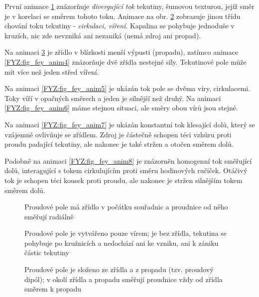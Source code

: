     První animace \ref{FYZ:fig_fey_anim1} znázorňuje \emph{divergující tok} tekutiny, šumovou 
    texturou, jejíž směr je v korelaci se směrem tohoto toku. Animace na obr. 
    \ref{FYZ:fig_fey_anim2} zobrazuje jinou třídu chování toku tekutiny  - \emph{cirkulaci, víření}. 
    Kapalina se pohybuje jednoduše v kruzích, nic zde nevzniká ani nezaniká (nemá zdroj ani 
    propad).   
                    
    Na animaci \ref{FYZ:fig_fey_anim3} je zřídlo v blízkosti menší výpusti (propadu), zatímco 
    animace \ref{FYZ:fig_fey_anim4} znázorňuje dvě zřídla nestejné síly. Tekutinové pole může mít 
    více než jeden střed víření. 
    
    Na animaci \ref{FYZ:fig_fey_anim5} je ukázán tok pole se dvěma víry, cirkulacemi. Toky víří v 
    opačných směrech a jeden je silnější než druhý. Na animaci \ref{FYZ:fig_fey_anim6} máme stejnou 
    situaci, ale směry obou vírů jsou stejné.    
    
    Na animaci \ref{FYZ:fig_fey_anim7} je ukázán konstantní tok klesající dolů, který se vzájemně 
    ovlivňuje se zřídlem. Zdroj je částečně schopen téci vzhůru proti proudu padající tekutiny, ale 
    nakonec je také stržen a otočen směrem dolů.
    
    Podobně na animaci \ref{FYZ:fig_fey_anim8} je znázorněn homogenní tok směřující dolů, 
    interagující s tokem cirkulujícím proti směru hodinových ručiček. Otáčivý tok je schopen téci 
    kousek proti proudu, ale nakonec je stržen silnějším tokem směrem dolů.           
    
    \begin{figure}
      \centering
      \caption{Proudové pole má zřídlo v počátku souřadnic a proudnice od něho směřují radiálně } 
      \label{FYZ:fig_fey_anim1}  
    \end{figure}
    
    \begin{figure} 
      \caption{Proudové pole je vytvářeno pouze vírem; je bez zřídla, tekutina se pohybuje po 
               kružnicích a nedochází ani ke vzniku, ani k zániku částic tekutiny }
      \label{FYZ:fig_fey_anim2} 
    \end{figure}
    
    \begin{figure}       
      \caption{Proudové pole je složeno ze zřídla a z propadu (tzv. proudový dipól); v okolí zřídla 
               a propadu směřují proudnice vždy od zřídla směrem k propadu}
      \label{FYZ:fig_fey_anim3}
    \end{figure}                                        
    
